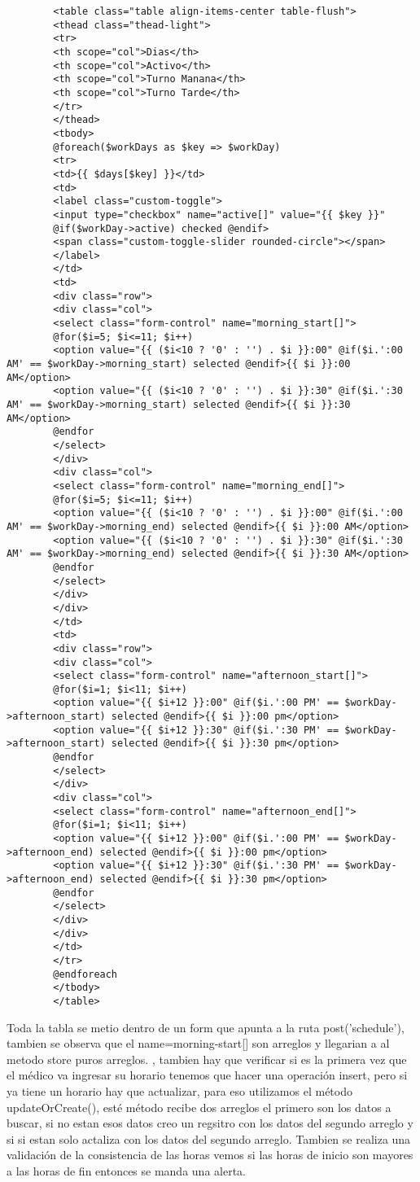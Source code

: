 \documentclass[a4paper]{article}
\begin{document}
\begin{lstlisting}
		<table class="table align-items-center table-flush">
		<thead class="thead-light">
		<tr>
		<th scope="col">Dias</th>
		<th scope="col">Activo</th>
		<th scope="col">Turno Manana</th>
		<th scope="col">Turno Tarde</th>
		</tr>
		</thead>
		<tbody>
		@foreach($workDays as $key => $workDay)
		<tr>
		<td>{{ $days[$key] }}</td>
		<td>
		<label class="custom-toggle">
		<input type="checkbox" name="active[]" value="{{ $key }}"
		@if($workDay->active) checked @endif>
		<span class="custom-toggle-slider rounded-circle"></span>
		</label>
		</td>
		<td>
		<div class="row">
		<div class="col">
		<select class="form-control" name="morning_start[]">
		@for($i=5; $i<=11; $i++)
		<option value="{{ ($i<10 ? '0' : '') . $i }}:00" @if($i.':00 AM' == $workDay->morning_start) selected @endif>{{ $i }}:00 AM</option>
		<option value="{{ ($i<10 ? '0' : '') . $i }}:30" @if($i.':30 AM' == $workDay->morning_start) selected @endif>{{ $i }}:30 AM</option>
		@endfor
		</select>
		</div>
		<div class="col">
		<select class="form-control" name="morning_end[]">
		@for($i=5; $i<=11; $i++)
		<option value="{{ ($i<10 ? '0' : '') . $i }}:00" @if($i.':00 AM' == $workDay->morning_end) selected @endif>{{ $i }}:00 AM</option>
		<option value="{{ ($i<10 ? '0' : '') . $i }}:30" @if($i.':30 AM' == $workDay->morning_end) selected @endif>{{ $i }}:30 AM</option>
		@endfor
		</select>
		</div>
		</div>
		</td>
		<td>
		<div class="row">
		<div class="col">
		<select class="form-control" name="afternoon_start[]">
		@for($i=1; $i<11; $i++)
		<option value="{{ $i+12 }}:00" @if($i.':00 PM' == $workDay->afternoon_start) selected @endif>{{ $i }}:00 pm</option>
		<option value="{{ $i+12 }}:30" @if($i.':30 PM' == $workDay->afternoon_start) selected @endif>{{ $i }}:30 pm</option>
		@endfor
		</select>
		</div>
		<div class="col">
		<select class="form-control" name="afternoon_end[]">
		@for($i=1; $i<11; $i++)
		<option value="{{ $i+12 }}:00" @if($i.':00 PM' == $workDay->afternoon_end) selected @endif>{{ $i }}:00 pm</option>
		<option value="{{ $i+12 }}:30" @if($i.':30 PM' == $workDay->afternoon_end) selected @endif>{{ $i }}:30 pm</option>
		@endfor
		</select>
		</div>
		</div>
		</td>
		</tr>
		@endforeach
		</tbody>
		</table>
	\end{lstlisting}
	
	Toda la tabla se metio dentro de un form que apunta a la ruta post('schedule'), tambien se observa que el name=morning-start[] son arreglos y llegarian a al metodo store puros arreglos.
	, tambien hay que verificar si es la primera vez que el médico va ingresar su horario tenemos que hacer una operación insert, pero si ya tiene un horario hay que actualizar, para eso utilizamos el método updateOrCreate(), esté método recibe dos arreglos el primero son los datos a buscar, si no estan esos datos creo un regsitro con los datos del segundo arreglo y si si estan solo actaliza con los datos del segundo arreglo. Tambien se realiza una validación de la consistencia de las horas vemos si las horas de inicio son mayores a las horas de fin entonces se manda una alerta.
	
\end{document}
